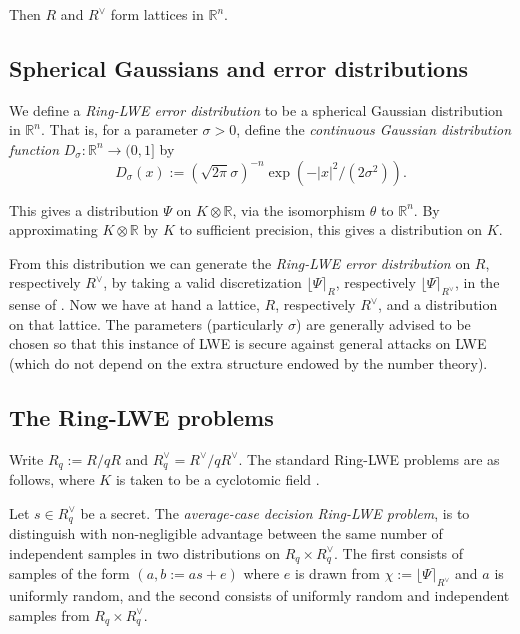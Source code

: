 \documentclass{llncs}
\newcommand{\RR}{\mathbb{R}}
\newcommand{\<}{\langle}
\renewcommand{\>}{\rangle}
\begin{document}
Then $R$ and $R^\vee$ form lattices in $\RR^n$.

\subsection{Spherical Gaussians and error distributions}

We define a \emph{Ring-LWE error distribution} to be a spherical Gaussian distribution in $\RR^n$.  That is, for a parameter $\sigma > 0$, define the \emph{continuous Gaussian distribution function} $D_\sigma: \RR^n \rightarrow (0,1]$ by
\[
        D_\sigma(x) := (\sqrt{2\pi}\sigma)^{-n}\operatorname{exp}\left( - |x|^2 / (2\sigma^2) \right).
\]

This gives a distribution $\Psi$ on $K \otimes \RR$, via the isomorphism $\theta$ to $\RR^n$.  By approximating $K \otimes \RR$ by $K$ to sufficient precision, this gives a distribution on $K$.

From this distribution we can generate the \emph{Ring-LWE error distribution} on $R$, respectively $R^\vee$, by taking a valid discretization $\lfloor \Psi \rceil_{R}$, respectively $\lfloor \Psi \rceil_{R^\vee}$, in the sense of \cite{LPR2}.  Now we have at hand a lattice, $R$, respectively $R^\vee$, and a distribution on that lattice.  The parameters (particularly $\sigma$) are generally advised to be chosen so that this instance of LWE is secure against general attacks on LWE (which do not depend on the extra structure endowed by the number theory).


\subsection{The Ring-LWE problems}

Write
$R_q := R/qR$ and $R_q^\vee = R^\vee/qR^\vee$.
The standard Ring-LWE problems are as follows, where $K$ is taken to be a cyclotomic field \cite{LPR10,LPR2}.

\begin{definition}
        Let $s \in R_q^\vee$ be a secret.  The \emph{average-case decision Ring-LWE problem}, is to distinguish with non-negligible advantage between the same number of independent samples in two distributions on $R_q \times R_q^\vee$.  The first consists of samples of the form $(a, b:=as +e )$ where $e$ is drawn from $\chi := \lfloor \Psi \rceil_{R^\vee}$ and $a$ is uniformly random, and the second consists of uniformly random and independent samples from $R_q \times R_q^\vee$.
\end{definition}
\end{document}
